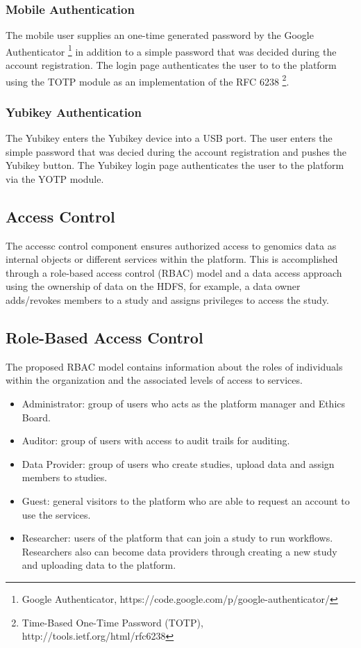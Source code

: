 \subsubsection {Mobile Authentication}
The mobile user supplies an one-time generated password by the Google Authenticator \footnote{Google Authenticator, https://code.google.com/p/google-authenticator/} in addition to a simple password that was decided during the account registration. The login page authenticates the user to to the platform using the TOTP module as an implementation of the RFC 6238 \footnote{Time-Based One-Time Password (TOTP), http://tools.ietf.org/html/rfc6238}.   

\subsubsection {Yubikey Authentication}
The Yubikey enters the Yubikey device into a USB port. The user enters the simple password that was decied during the account registration and pushes the Yubikey button. The Yubikey login page authenticates the user to the platform via the YOTP module.

\subsection {Access Control}
The accessc control component ensures authorized access to genomics data as internal objects or different services within the platform. This is accomplished through a role-based access control (RBAC) model and a data access approach using the ownership of data on the HDFS, for example, a data owner adds/revokes members to a study and assigns privileges to access the study.

\subsection {Role-Based Access Control}

The proposed RBAC model contains information about the roles of individuals within the organization and the associated levels of access to services.

\begin{itemize}
\item Administrator: group of users who acts as the platform manager and Ethics Board.

\item Auditor: group of users with access to audit trails for auditing.

\item Data Provider: group of users who create studies, upload data and assign members to studies.

\item Guest: general visitors to the platform who are able to request an account to use the services.

\item Researcher: users of the platform that can join a study to run workflows. Researchers also can become data providers through creating a new study and uploading data to the platform.

\end{itemize}


